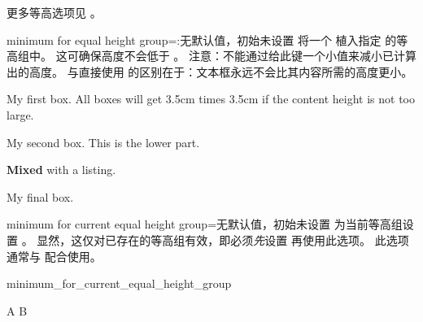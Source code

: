 \medskip
\begin{marker}
更多等高选项见 。
\end{marker}

\clearpage
\begin{docTcbKey}{minimum for equal height group}{=:}{无默认值，初始未设置}
  将一个  植入指定  的等高组中。
  这可确保高度不会低于 。
  注意：不能通过给此键一个小值来减小已计算出的高度。
  与直接使用  的区别在于：文本框永远不会比其内容所需的高度更小。

\begin{dispExample}

\begin{tcolorbox}
  My first box. All boxes will get 3.5cm times 3.5cm
  if the content height is not too large.
\end{tcolorbox}%
\begin{tcolorbox}
  My second box.
  \tcblower
  This is the lower part.
\end{tcolorbox}%
\begin{tcblisting}{}
\textbf{Mixed}
with a listing.
\end{tcblisting}
\begin{tcolorbox}[title={Fourth box}]
  My final box.
\end{tcolorbox}%
\end{dispExample}
\end{docTcbKey}


\begin{docTcbKey}[][doc new=2016-03-24]{minimum for current equal height group}{=}{无默认值，初始未设置}
  为当前等高组设置 。
  显然，这仅对已存在的等高组有效，即必须\emph{先}设置
   再使用此选项。
  此选项通常与  配合使用。

\begin{exdispExample}[runs=2]{minimum_for_current_equal_height_group}
\begin{tcbitemize}[raster equal height,colframe=blue!75!black,colback=white,
  raster every box/.style={minimum for current equal height group=2cm}]
  \tcbitem A
  \tcbitem B
\end{tcbitemize}
\end{exdispExample}

\end{docTcbKey}


